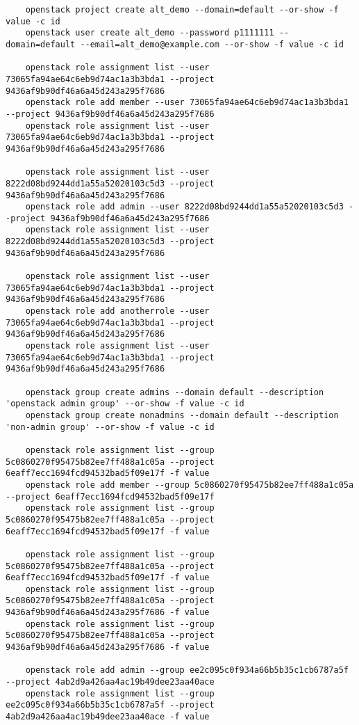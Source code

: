 \documentclass[a4paper,left=1.5cm,right=1.5cm,11pt]{article}
\begin{document}
\begin{lstlisting}
	openstack project create alt_demo --domain=default --or-show -f value -c id
	openstack user create alt_demo --password p1111111 --domain=default --email=alt_demo@example.com --or-show -f value -c id
	
	openstack role assignment list --user 73065fa94ae64c6eb9d74ac1a3b3bda1 --project 9436af9b90df46a6a45d243a295f7686
	openstack role add member --user 73065fa94ae64c6eb9d74ac1a3b3bda1 --project 9436af9b90df46a6a45d243a295f7686
	openstack role assignment list --user 73065fa94ae64c6eb9d74ac1a3b3bda1 --project 9436af9b90df46a6a45d243a295f7686
	
	openstack role assignment list --user 8222d08bd9244dd1a55a52020103c5d3 --project 9436af9b90df46a6a45d243a295f7686
	openstack role add admin --user 8222d08bd9244dd1a55a52020103c5d3 --project 9436af9b90df46a6a45d243a295f7686
	openstack role assignment list --user 8222d08bd9244dd1a55a52020103c5d3 --project 9436af9b90df46a6a45d243a295f7686
	
	openstack role assignment list --user 73065fa94ae64c6eb9d74ac1a3b3bda1 --project 9436af9b90df46a6a45d243a295f7686
	openstack role add anotherrole --user 73065fa94ae64c6eb9d74ac1a3b3bda1 --project 9436af9b90df46a6a45d243a295f7686
	openstack role assignment list --user 73065fa94ae64c6eb9d74ac1a3b3bda1 --project 9436af9b90df46a6a45d243a295f7686
	
	openstack group create admins --domain default --description 'openstack admin group' --or-show -f value -c id
	openstack group create nonadmins --domain default --description 'non-admin group' --or-show -f value -c id
	
	openstack role assignment list --group 5c0860270f95475b82ee7ff488a1c05a --project 6eaff7ecc1694fcd94532bad5f09e17f -f value
	openstack role add member --group 5c0860270f95475b82ee7ff488a1c05a --project 6eaff7ecc1694fcd94532bad5f09e17f
	openstack role assignment list --group 5c0860270f95475b82ee7ff488a1c05a --project 6eaff7ecc1694fcd94532bad5f09e17f -f value
	
	openstack role assignment list --group 5c0860270f95475b82ee7ff488a1c05a --project 6eaff7ecc1694fcd94532bad5f09e17f -f value
	openstack role assignment list --group 5c0860270f95475b82ee7ff488a1c05a --project 9436af9b90df46a6a45d243a295f7686 -f value
	openstack role assignment list --group 5c0860270f95475b82ee7ff488a1c05a --project 9436af9b90df46a6a45d243a295f7686 -f value
	
	openstack role add admin --group ee2c095c0f934a66b5b35c1cb6787a5f --project 4ab2d9a426aa4ac19b49dee23aa40ace
	openstack role assignment list --group ee2c095c0f934a66b5b35c1cb6787a5f --project 4ab2d9a426aa4ac19b49dee23aa40ace -f value
	\end{lstlisting}
\end{document}

